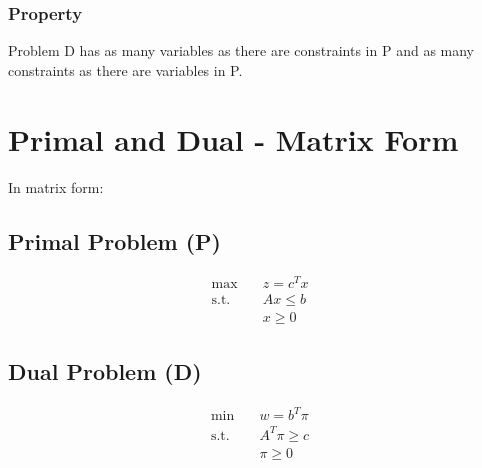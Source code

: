 \documentclass[a4paper, 11pt]{article}
\begin{document}
\subsubsection*{Property}
Problem D has as many variables as there are constraints in P and as many constraints as there are variables in P.

\section{Primal and Dual - Matrix Form}

In matrix form:

\subsection{Primal Problem (P)}

\begin{align*}
\max & \quad z = c^{T} x \\
\text{s.t.} & \quad A x \leq b \\
& \quad x \geq 0
\end{align*}

\subsection{Dual Problem (D)}

\begin{align*}
\min & \quad w = b^{T} \pi \\
\text{s.t.} & \quad A^{T} \pi \geq c \\
& \quad \pi \geq 0
\end{align*} 
\end{document}
